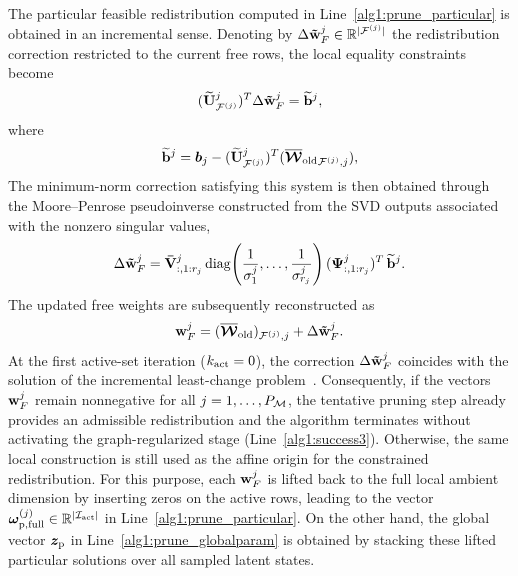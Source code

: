 \documentclass[preprint,10pt]{elsarticle}  %
\begin{document}


The particular feasible redistribution computed in
Line~\ref{alg1:prune_particular} is obtained in an incremental
sense. Denoting by \(\Delta\mathbf{\tilde{w}}_{F}^{j}\in\mathbb{R}^{|\mathcal{F}^{(j)}|}\) the redistribution
correction restricted to the current free rows, the local equality
constraints become
\[
({\widetilde{\mathbf{U}}^{j}}_{\mathcal{F}^{(j)}})^T \Delta\mathbf{\tilde{w}}_{F}^{j}
=
\widetilde{\mathbf{b}}^{j},
\]
where
\[
\widetilde{\mathbf{b}}^{j}
=
\bm{b}_{j}
-
({\widetilde{\mathbf{U}}^{j}}_{\mathcal{F}^{(j)}})^T
({\overline{\boldsymbol{\mathcal{W}}}_{\mathrm{old}}}_{\mathcal{F}^{(j)},j}),
\]
The minimum-norm correction satisfying this system is then obtained
through the Moore--Penrose pseudoinverse constructed from the SVD
outputs associated with the nonzero singular values,
\[
\Delta\mathbf{\tilde{w}}_{F}^{j}
=
\mathbf{\bar{V}}^{j}_{:,1:r_j}
\operatorname{diag}\!\left(
\frac{1}{\sigma_1^{j}},\ldots,
\frac{1}{\sigma_{r_j}^{j}}
\right)
(\boldsymbol{\Psi}^{j}_{:,1:r_j})^T
\,\widetilde{\mathbf{b}}^{j}.
\]
The updated free weights are subsequently reconstructed as
\begin{equation}
\label{eq:particularSOLUTION}
\mathbf{w}_{F}^{j}
=
({\overline{\boldsymbol{\mathcal{W}}}_{\mathrm{old}}})_{\mathcal{F}^{(j)},j}
+
\Delta\mathbf{\tilde{w}}_{F}^{j}.
\end{equation}
At the first active-set iteration (\(k_{\mathrm{act}}=0\)), the correction
\(\Delta\mathbf{\tilde{w}}_{F}^{j}\) coincides with the solution of the incremental
least-change problem~. Consequently, if the
vectors \(\mathbf{w}_{F}^{j}\) remain nonnegative for all
\(j=1,\ldots,P_{\mathcal{M}}\), the tentative pruning step already provides an
admissible redistribution and the algorithm terminates without
activating the graph-regularized stage
(Line~\ref{alg1:success3}). Otherwise, the same local construction is still used as the affine
origin for the constrained redistribution. For this purpose, each
\(\mathbf{w}_{F}^{j}\) is lifted back to the full local ambient dimension by
inserting zeros on the active rows, leading to the vector
\(\bm{\omega}_{\mathrm{p,full}}^{(j)}\in\mathbb{R}^{|\mathcal{I}_{\mathrm{act}}|}\)   in Line~\ref{alg1:prune_particular}. On the other hand, the global vector \(\bm{z}_{\mathrm{p}}\) in
Line~\ref{alg1:prune_globalparam} is obtained by stacking these lifted
particular solutions over all sampled latent states.
\end{document}
